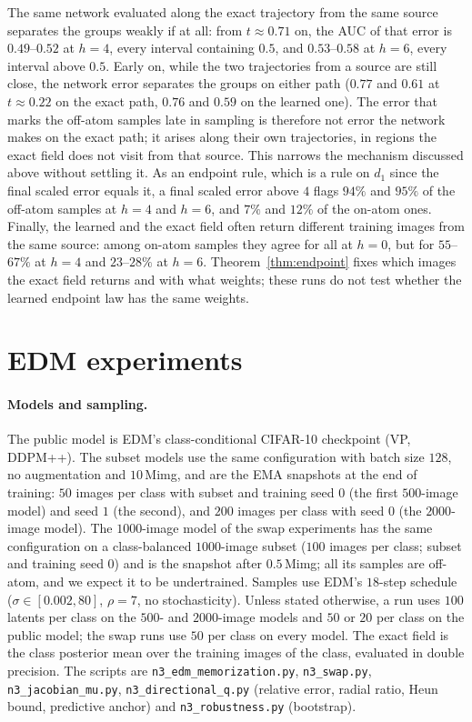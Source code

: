 \documentclass{article} %
\theoremstyle{plain}
\theoremstyle{definition}
\theoremstyle{remark}
\begin{document}
The same network evaluated along the exact trajectory from the same source separates the groups
weakly if at all: from $t\approx0.71$ on, the AUC of that error is $0.49$--$0.52$ at $h=4$, every
interval containing $0.5$, and $0.53$--$0.58$ at $h=6$, every interval above $0.5$. Early on, while
the two trajectories from a source are still close, the network error separates the groups on
either path ($0.77$ and $0.61$ at $t\approx0.22$ on the exact path, $0.76$ and $0.59$ on the learned
one). The error that marks the off-atom samples late in sampling is therefore not error the network
makes on the exact path; it arises along their own trajectories, in regions the exact field does
not visit from that source. This narrows the mechanism discussed above without settling it. As an
endpoint rule, which is a rule on $d_1$ since the final scaled error equals it, a final scaled
error above $4$ flags $94\%$ and $95\%$ of the
off-atom samples at $h=4$ and $h=6$, and $7\%$ and $12\%$ of the on-atom ones. Finally, the
learned and the exact field often return different training images from the same source: among
on-atom samples they agree for all at $h=0$, but for $55$--$67\%$ at $h=4$ and $23$--$28\%$ at
$h=6$. Theorem~\ref{thm:endpoint} fixes which images the exact field returns and with what
weights; these runs do not test whether the learned endpoint law has the same weights.


\section{EDM experiments}
\label{app:relerr-exp}

\paragraph{Models and sampling.} The public model is EDM's class-conditional CIFAR-10 checkpoint
(VP, DDPM++). The subset models use the same configuration with batch size $128$, no augmentation
and $10$\,Mimg, and are the EMA snapshots at the end of training: $50$ images per class with subset
and training seed $0$ (the first $500$-image model) and seed $1$ (the second), and $200$ images per
class with seed $0$ (the $2000$-image model). The $1000$-image model of the swap experiments has
the same configuration on a class-balanced $1000$-image subset ($100$ images per class; subset and
training seed $0$) and is the snapshot after $0.5$\,Mimg; all its samples are off-atom, and we
expect it to be undertrained. Samples use EDM's $18$-step schedule ($\sigma\in[0.002,80]$,
$\rho=7$, no stochasticity). Unless stated otherwise, a run uses $100$ latents per class on the
$500$- and $2000$-image models and $50$ or $20$ per class on the public model; the swap runs use
$50$ per class on every model. The exact
field is the class posterior mean over the training images of the class, evaluated in double
precision. The scripts are \texttt{n3\_edm\_memorization.py}, \texttt{n3\_swap.py},
\texttt{n3\_jacobian\_mu.py}, \texttt{n3\_directional\_q.py} (relative error, radial ratio, Heun
bound, predictive anchor) and \texttt{n3\_robustness.py} (bootstrap).
\end{document}
